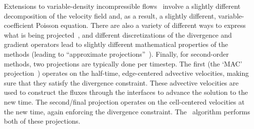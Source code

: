 Extensions to variable-density incompressible
flows~\cite{bellMarcus:1992b} involve a slightly different
decomposition of the velocity field and, as a result, a slightly
different, variable-coefficient Poisson equation.
There are also a variety of different ways
to express what is being projected~\cite{almgren:bell:crutchfield},
and different discretizations of the divergence and gradient operators
lead to slightly different mathematical properties of the methods
(leading to ``approximate
projections''~\cite{almgrenBellSzymczak:1996}).  Finally, for
second-order methods, two projections are typically done per timestep.
The first (the `MAC' projection~\cite{bellColellaHowell:1991})
operates on the half-time, edge-centered advective velocities, making
sure that they satisfy the divergence constraint.  These advective
velocities are used to construct the fluxes through the interfaces to
advance the solution to the new time.  The second/final projection
operates on the cell-centered velocities at the new time, again
enforcing the divergence constraint.  The \iamr\ algorithm performs
both of these projections.
